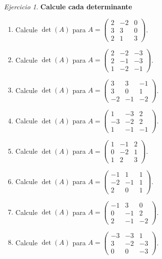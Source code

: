 \documentclass[12pt]{article}
\theoremstyle{remark}
\newtheorem{Ejer}[definicion]{Ejercicio}
\begin{document}
\begin{Ejer}

\textbf{Calcule cada determinante }
\begin{enumerate}[start=151]

\item Calcule $\det(A)$ para $A=\begin{pmatrix}2&-2&0\\3&3&0\\2&1&3\end{pmatrix}$.

\item Calcule $\det(A)$ para $A=\begin{pmatrix}2&-2&-3\\2&-1&-3\\1&-2&-1\end{pmatrix}$.

\item Calcule $\det(A)$ para $A=\begin{pmatrix}3&3&-1\\3&0&1\\-2&-1&-2\end{pmatrix}$.

\item Calcule $\det(A)$ para $A=\begin{pmatrix}1&-3&2\\-3&-2&2\\1&-1&-1\end{pmatrix}$.

\item Calcule $\det(A)$ para $A=\begin{pmatrix}1&-1&2\\0&-2&1\\1&2&3\end{pmatrix}$.

\item Calcule $\det(A)$ para $A=\begin{pmatrix}-1&1&1\\-2&-1&1\\2&0&1\end{pmatrix}$.

\item Calcule $\det(A)$ para $A=\begin{pmatrix}-1&3&0\\0&-1&2\\2&-1&-2\end{pmatrix}$.

\item Calcule $\det(A)$ para $A=\begin{pmatrix}-3&-3&1\\3&-2&-3\\0&0&-3\end{pmatrix}$.


\end{enumerate}
\end{Ejer}
\end{document}
